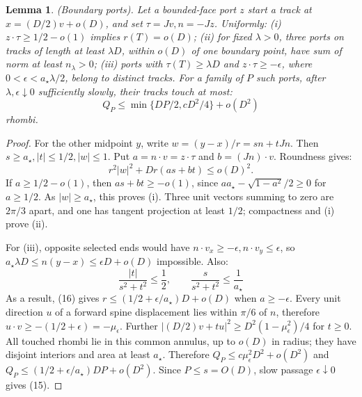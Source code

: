 \documentclass[10pt,reqno]{amsart}
\newtheorem{lemma}{Lemma}[section]
\begin{document}
\begin{lemma}
    (Boundary ports). Let a bounded-face port $z$ start a track at $x = (D / 2)v + o(D)$, and set $\tau = Jv, n = -J z$. Uniformly: (i) $z \cdot \tau \ge 1 / 2 - o(1)$ implies $r(T) = o(D)$; (ii) for fixed $\lambda > 0$, three ports on tracks of length at least $\lambda D$, within $o(D)$ of one boundary point, have sum of norm at least $n_\lambda > 0$; (iii) ports with $\tau(T) \ge \lambda D$ and $z \cdot \tau \ge - \epsilon$, where $0 < \epsilon < a_\star \lambda / 2$, belong to distinct tracks. For a family of $P$ such ports, after $\lambda, \epsilon \downarrow 0$ sufficiently slowly, their tracks touch at most:
    \begin{equation}
        Q_P \le \min \{DP / 2, cD^2 / 4\} + o ( D^2 )
    \end{equation}
    rhombi.
\end{lemma}

\begin{proof}
    For the other midpoint $y$, write $w = (y - x) / r = sn + t J n$. Then $s \ge a_\star, |t| \le 1 / 2, |w| \le 1$. Put $a = n \cdot v = z \cdot \tau$ and $b = (J n) \cdot v$. Roundness gives:
    \begin{equation}
        r^2 |w|^2 + Dr (as + bt) \le o(D)^2.
    \end{equation}
    If $a \ge 1 / 2 - o(1)$, then $as + bt \ge - o(1)$, since $a a_\star - \sqrt{1 - a^2} / 2 \ge 0$ for $a \ge 1 / 2$. As $|w| \ge a_\star$, this proves (i). Three unit vectors summing to zero are $2 \pi / 3$ apart, and one has tangent projection at least $1 / 2$; compactness and (i) prove (ii).

    For (iii), opposite selected ends would have $n \cdot v_x \ge - \epsilon, n \cdot v_y \le \epsilon$, so $a_\star \lambda D \le n (y - x) \le \epsilon D + o(D)$ impossible. Also:
    \begin{equation}
        \frac{|t|}{s^2 + t^2} \le \frac{1}{2}, \qquad \frac{s}{s^2 + t^2} \le \frac{1}{a_\star}
    \end{equation}
    As a result, (16) gives $r \le ( 1 / 2 + \epsilon / a_\star) D + o(D)$ when $a \ge - \epsilon$. Every unit direction $u$ of a forward spine displacement lies within $\pi / 6$ of $n$, therefore $u \cdot v \ge -(1/2 + \epsilon) = - \mu_\epsilon$. Further $|(D / 2)v + tu|^2 \ge D^2 (1 - \mu_\epsilon^2) / 4$ for $t \ge 0$. All touched rhombi lie in this common annulus, up to $o(D)$ in radius; they have disjoint interiors and area at least $a_\star$. Therefore $Q_P \le c \mu_\epsilon^2 D^2 + o(D^2)$ and $Q_P \le (1 / 2 + \epsilon / a_\star) DP + o(D^2)$. Since $P \le s = O(D)$, slow passage $\epsilon \downarrow 0$ gives (15).
\end{proof}
\end{document}
